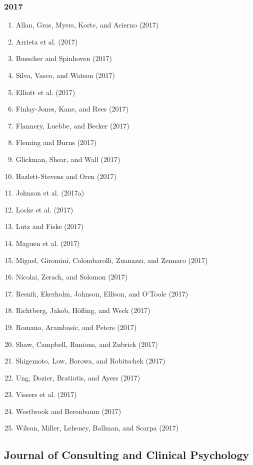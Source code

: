 \documentclass[english,man]{apa6}
\providecommand{\tightlist}{%
  \setlength{\itemsep}{0pt}\setlength{\parskip}{0pt}}
\begin{document}
\subsubsection{2017}\label{section-1}

\begin{enumerate}
\def\labelenumi{\arabic{enumi})}
\tightlist
\item
  Allan, Gros, Myers, Korte, and Acierno (2017)
\item
  Arrieta et al. (2017)
\item
  Busscher and Spinhoven (2017)
\item
  Silva, Vasco, and Watson (2017)
\item
  Elliott et al. (2017)
\item
  Finlay-Jones, Kane, and Rees (2017)
\item
  Flannery, Luebbe, and Becker (2017)
\item
  Fleming and Burns (2017)
\item
  Glickman, Shear, and Wall (2017)
\item
  Hazlett-Stevens and Oren (2017)
\item
  Johnson et al. (2017a)
\item
  Locke et al. (2017)
\item
  Lutz and Fiske (2017)
\item
  Maguen et al. (2017)
\item
  Miguel, Giromini, Colombarolli, Zuanazzi, and Zennaro (2017)
\item
  Nicolai, Zerach, and Solomon (2017)
\item
  Resnik, Ekerholm, Johnson, Ellison, and O'Toole (2017)
\item
  Richtberg, Jakob, Höfling, and Weck (2017)
\item
  Romano, Arambasic, and Peters (2017)
\item
  Shaw, Campbell, Runions, and Zubrick (2017)
\item
  Shigemoto, Low, Borowa, and Robitschek (2017)
\item
  Ung, Dozier, Bratiotis, and Ayers (2017)
\item
  Vissers et al. (2017)
\item
  Westbrook and Berenbaum (2017)
\item
  Wilson, Miller, Leheney, Ballman, and Scarpa (2017)
\end{enumerate}

\subsection{Journal of Consulting and Clinical
Psychology}\label{journal-of-consulting-and-clinical-psychology}
\end{document}
